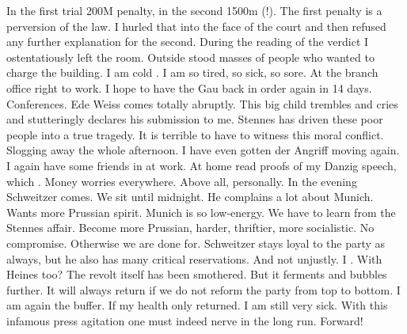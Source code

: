 In the first trial 200M penalty, in the second 1500m (!). The first penalty is a perversion of the law. I hurled that into the face of the court and then refused any further explanation for the second. During the reading of the verdict I ostentatiously left the room. Outside stood masses of people who wanted to charge the building. I am cold . I am so tired, so sick, so sore. At the branch office right to work. I hope to have the Gau back in order again in 14 days. Conferences. Ede Weiss comes totally abruptly. This big child trembles and cries and stutteringly declares his submission to me. Stennes has driven these poor people into a true tragedy. It is terrible to have to witness this moral conflict. Slogging away the whole afternoon. I have even gotten der Angriff moving again. I again have some friends in at work. At home read proofs of my Danzig speech, which . Money worries everywhere. Above all, personally. In the evening Schweitzer comes. We sit until midnight. He complains a lot about Munich. Wants more Prussian spirit. Munich is so low-energy. We have to learn from the Stennes affair. Become more Prussian, harder, thriftier, more socialistic. No compromise. Otherwise we are done for. Schweitzer stays loyal to the party as always, but he also has many critical reservations. And not unjustly. I . With Heines too? The revolt itself has been smothered. But it ferments and bubbles further. It will always return if we do not reform the party from top to bottom. I am again the buffer. If my health only returned. I am still very sick. With this infamous press agitation one must indeed nerve in the long run. Forward!  


